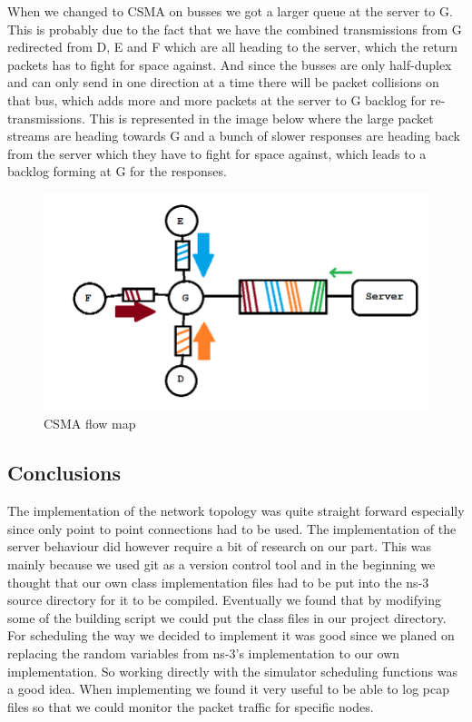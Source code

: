 \documentclass{article}
\begin{document}
When we changed to CSMA on busses we got a larger queue at the server to G. This is probably due
to the fact that we have the combined transmissions from G redirected from D, E and F which are 
all heading to the server, which the return packets has to fight for space against. And since the
busses are only half-duplex and can only send in one direction at a time there will be packet 
collisions on that bus, which adds more and more packets at the server to G backlog for re-transmissions.
This is represented in the image below where the large packet streams are heading towards G and a bunch 
of slower responses are heading back from the server which they have to fight for space against, which 
leads to a backlog forming at G for the responses.
\begin{figure}[h!]
  \includegraphics[width=\linewidth]{csmamap.png}
  \caption{CSMA flow map}
  \label{fig:csma}
\end{figure}

\subsection{Conclusions}
The implementation of the network topology was quite straight forward especially since only point to point connections had to be used.
The implementation of the server behaviour did however require a bit of research on our part.
This was mainly because we used git as a version control tool and in the beginning we thought that our own class implementation files had to be put into the ns-3 source directory for it to be compiled.
Eventually we found that by modifying some of the building script we could put the class files in our project directory.
For scheduling the way we decided to implement it was good since we planed on replacing the random variables from ns-3's implementation to our own implementation.
So working directly with the simulator scheduling functions was a good idea.
When implementing we found it very useful to be able to log pcap files so that we could monitor the packet traffic for specific nodes.



\end{document}
